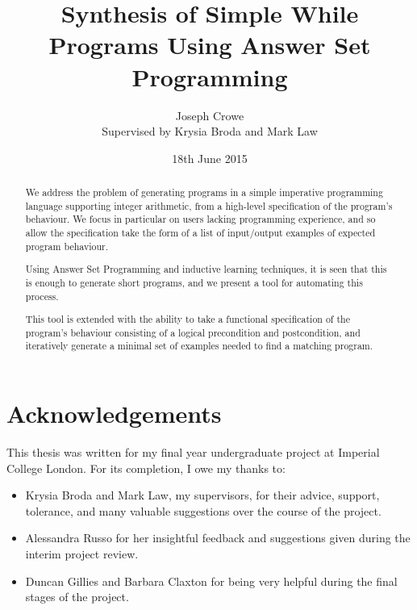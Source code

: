 \documentclass[a4paper,twoside,notitlepage]{report}
\begin{document}
\title{Synthesis of Simple While Programs Using Answer Set Programming}
\author{Joseph Crowe \\ Supervised by Krysia Broda and Mark Law}
\date{18th June 2015}
\maketitle

\vfill

\begin{abstract}
We address the problem of generating programs in a simple imperative 
programming language supporting integer arithmetic, from a high-level 
specification of the program's behaviour. We focus in particular on users 
lacking programming experience, and so allow the specification take the 
form of a list of input/output examples of expected program behaviour.

Using Answer Set Programming and inductive learning techniques, it is seen 
that this is enough to generate short programs, and we present a tool for 
automating this process.

This tool is extended with the ability to take a functional specification 
of the program's behaviour consisting of a logical precondition and 
postcondition, and iteratively generate a minimal set of examples needed 
to find a matching program.
\end{abstract}

\vfill
\vfill

\clearpage

\section*{Acknowledgements}
This thesis was written for my final year undergraduate project at 
Imperial College London. For its completion, I owe my thanks to:
\begin{itemize}
    \item Krysia Broda and Mark Law, my supervisors, for their advice, 
    support, tolerance, and many valuable suggestions over the course of 
    the project.
    \item Alessandra Russo for her insightful feedback and suggestions 
    given during the interim project review.
    \item Duncan Gillies and Barbara Claxton for being very helpful during 
    the final stages of the project.
\end{itemize}
\clearpage

\tableofcontents
\end{document}
